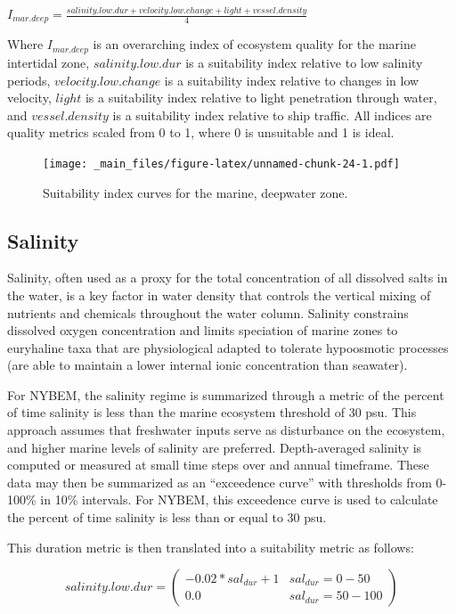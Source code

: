 \documentclass[
]{book}
\begin{document}
\(I_{mar.deep} = \frac{salinity.low.dur + velocity.low.change + light + vessel.density}{4}\)

Where \(I_{mar.deep}\) is an overarching index of ecosystem quality for the marine intertidal zone, \(salinity.low.dur\) is a suitability index relative to low salinity periods, \(velocity.low.change\) is a suitability index relative to changes in low velocity, \(light\) is a suitability index relative to light penetration through water, and \(vessel.density\) is a suitability index relative to ship traffic. All indices are quality metrics scaled from 0 to 1, where 0 is unsuitable and 1 is ideal.

\begin{figure}
\centering
\texttt{[image: \_main\_files/figure-latex/unnamed-chunk-24-1.pdf]}
\caption{\label{fig:unnamed-chunk-24}Suitability index curves for the marine, deepwater zone.}
\end{figure}

\hypertarget{salinity-2}{%
\subsection{Salinity}\label{salinity-2}}

Salinity, often used as a proxy for the total concentration of all dissolved salts in the water, is a key factor in water density that controls the vertical mixing of nutrients and chemicals throughout the water column. Salinity constrains dissolved oxygen concentration and limits speciation of marine zones to euryhaline taxa that are physiological adapted to tolerate hypoosmotic processes (are able to maintain a lower internal ionic concentration than seawater).

For NYBEM, the salinity regime is summarized through a metric of the percent of time salinity is less than the marine ecosystem threshold of 30 psu. This approach assumes that freshwater inputs serve as disturbance on the ecosystem, and higher marine levels of salinity are preferred. Depth-averaged salinity is computed or measured at small time steps over and annual timeframe. These data may then be summarized as an ``exceedence curve'' with thresholds from 0-100\% in 10\% intervals. For NYBEM, this exceedence curve is used to calculate the percent of time salinity is less than or equal to 30 psu.

This duration metric is then translated into a suitability metric as follows:

\[salinity.low.dur = \begin{pmatrix} -0.02*sal_{dur}+1 & sal_{dur}=0-50\\
0.0 & sal_{dur}=50-100
\end{pmatrix}\]
\end{document}

